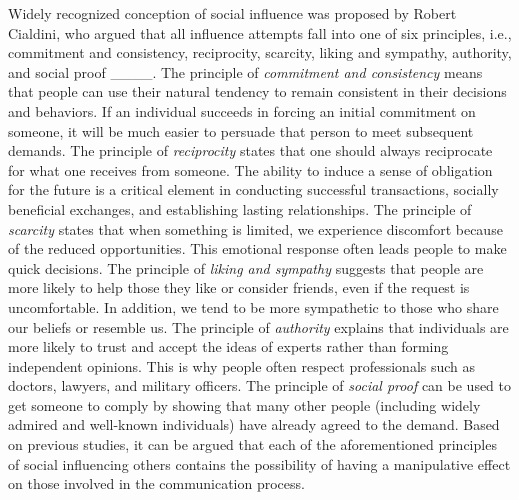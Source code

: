 Widely recognized conception of social influence was proposed by Robert Cialdini, who argued that all influence attempts fall into one of six principles, i.e., commitment and consistency, reciprocity, scarcity, liking and sympathy, authority, and social proof ____.  
The principle of \textit{commitment and consistency} means that people can use their natural tendency to remain consistent in their decisions and behaviors.  If an individual succeeds in forcing an initial commitment on someone, it will be much easier to persuade that person to meet subsequent demands. The principle of \textit{reciprocity} states that one should always reciprocate for what one receives from someone. The ability to induce a sense of obligation for the future is a critical element in conducting successful transactions, socially beneficial exchanges, and establishing lasting relationships. The principle of \textit{scarcity }states that when something is limited, we experience discomfort because of the reduced opportunities. This emotional response often leads people to make quick decisions. The principle of \textit{liking and sympathy} suggests that people are more likely to help those they like or consider friends, even if the request is uncomfortable. In addition, we tend to be more sympathetic to those who share our beliefs or resemble us. The principle of \textit{authority} explains that individuals are more likely to trust and accept the ideas of experts rather than forming independent opinions. This is why people often respect professionals such as doctors, lawyers, and military officers. The principle of \textit{social proof }can be used to get someone to comply by showing that many other people (including widely admired and well-known individuals) have already agreed to the demand.
Based on previous studies, it can be argued that each of the aforementioned principles of social influencing others contains the possibility of having a manipulative effect on those involved in the communication process.